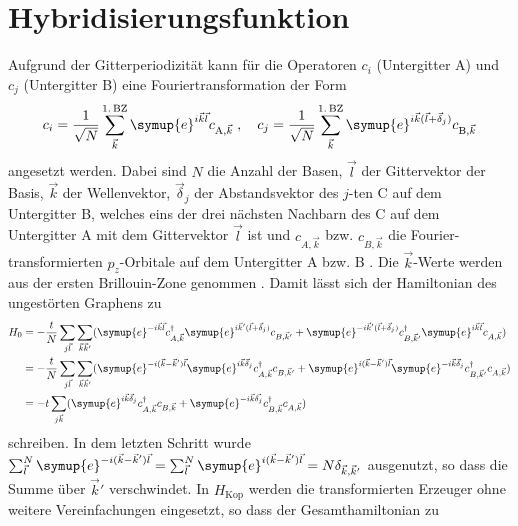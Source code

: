 \section{Hybridisierungsfunktion}
\label{sec:calc_greensfunction}
Aufgrund der Gitterperiodizität kann für die Operatoren $c_i$ (Untergitter A) und $c_j$ (Untergitter B) eine Fouriertransformation der Form 
\begin{equation}
    c_i = \frac{1}{\sqrt{N}} \sum_{\vec{k}}^{1. \, \text{BZ}} \symup{e}^{i\vec{k}\vec{l}} c_{\text{A}, \vec{k}} \; , 
    \quad c_j = \frac{1}{\sqrt{N}} \sum_{\vec{k}}^{1. \, \text{BZ}} \symup{e}^{i\vec{k}(\vec{l}+\vec{\delta}_j)} c_{\text{B}, \vec{k}} \label{eqn:fourier_ladder}
\end{equation}
angesetzt werden.
Dabei sind $N$ die Anzahl der Basen, $\vec{l}$ der Gittervektor der Basis, $\vec{k}$ der Wellenvektor, $\vec{\delta}_j$ der Abstandsvektor
des $j$-ten C auf dem Untergitter B, welches eins der drei nächsten Nachbarn des C auf dem Untergitter A mit dem Gittervektor $\vec{l}$ ist 
und $c_{A, \vec{k}}$ bzw. $c_{B, \vec{k}}$ die Fourier-transformierten $p_z$-Orbitale auf dem Untergitter A bzw. B \cite{anders-fkt}.
Die $\vec{k}$-Werte werden aus der ersten Brillouin-Zone genommen \cite{anders-fkt}.
Damit lässt sich der Hamiltonian des ungestörten Graphens zu 
\begin{align*}
    H_0 &= -\frac{t}{N} \sum_{j\vec{l}} \sum_{\vec{k}\vec{k}'} ( \symup{e}^{-i\vec{k}\vec{l}}c^\dagger_{A,\vec{k}} 
    \symup{e}^{i\vec{k}'(\vec{l}+\vec{\delta}_j)}c_{B,\vec{k}'} + \symup{e}^{-i\vec{k}'(\vec{l}+\vec{\delta}_j)} c^\dagger_{B,\vec{k}'} 
    \symup{e}^{i\vec{k}\vec{l}}c_{A,\vec{k}}) \\
    &= -\frac{t}{N} \sum_{j\vec{l}} \sum_{\vec{k}\vec{k}'} ( \symup{e}^{-i(\vec{k}- \vec{k}')\vec{l}}\symup{e}^{i\vec{k}\vec{\delta}_j}c^\dagger_{A,\vec{k}} c_{B,\vec{k}'} + 
    \symup{e}^{i(\vec{k}- \vec{k}')\vec{l}} \symup{e}^{-i\vec{k}\vec{\delta}_j} c^\dagger_{B,\vec{k}'}c_{A,\vec{k}}) \\
    &= -t \sum_{j\vec{k}} ( \symup{e}^{i\vec{k}\vec{\delta}_j}c^\dagger_{A,\vec{k}} c_{B,\vec{k}} + 
    \symup{e}^{-i\vec{k}\vec{\delta_j}} c^\dagger_{B,\vec{k}}c_{A,\vec{k}})
\end{align*}
schreiben.
In dem letzten Schritt wurde $\sum_{\vec{l}}^N \symup{e}^{-i(\vec{k}- \vec{k}')\vec{l}} 
= \sum_{\vec{l}}^N \symup{e}^{i(\vec{k}- \vec{k}')\vec{l}} = N\delta_{\vec{k}, \vec{k}'}$ ausgenutzt, so dass die Summe über $\vec{k}'$ verschwindet.
In $H_\text{Kop}$ werden die transformierten Erzeuger ohne weitere Vereinfachungen eingesetzt,  so dass der Gesamthamiltonian zu 
